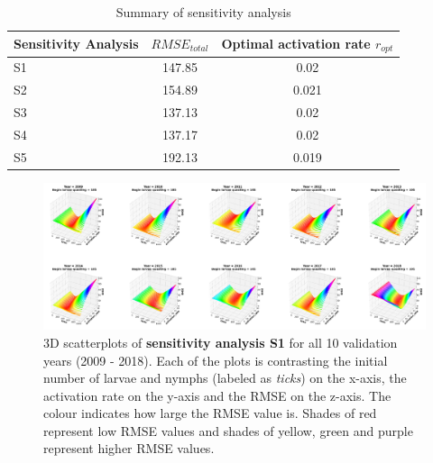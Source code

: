 \documentclass[a4paper, 11pt]{scrartcl}
\begin{document}
\begin{table}[h!]
\caption{Summary of sensitivity analysis}
\label{tab:summary}
\begin{tabularx}{\textwidth}{lcc}
\toprule
\textbf{Sensitivity Analysis} & \textbf{$RMSE_{total}$} & \textbf{Optimal activation rate $r_{opt}$} \\
\midrule
S1 & 147.85 & 0.02 \\
S2 & 154.89 & 0.021 \\
S3 & 137.13 & 0.02 \\
S4 & 137.17 & 0.02 \\
S5 & 192.13 & 0.019 \\
\bottomrule
\end{tabularx}
\end{table}



\printbibliography[heading = bibintoc, title = {Bibliography}]

\clearpage

\begin{figure}
\centering
\includegraphics[width=\linewidth]{figures/initial_ticks_with_beech_error_v1.png}
\caption{3D scatterplots of \textbf{sensitivity analysis S1} for all 10 validation years (2009 - 2018). Each of the plots is contrasting the initial number of larvae and nymphs
(labeled as \textit{ticks}) on the x-axis, the activation rate on the y-axis and the RMSE on the z-axis. The colour indicates how large the RMSE value is. Shades of
red represent low RMSE values and shades of yellow, green and purple represent higher RMSE values.}
\label{fig:initial_ticks_with_beech_error_v1_roteted}
\end{figure}
\end{document}
